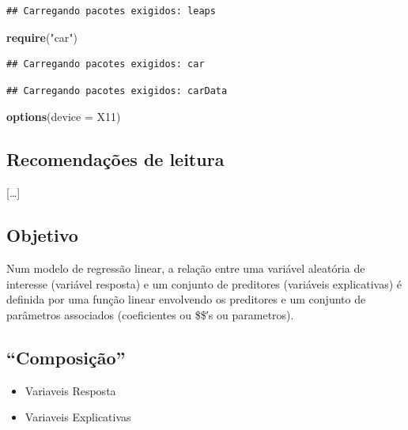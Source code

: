 \documentclass[
]{article}
\newenvironment{Shaded}{\begin{snugshade}}{\end{snugshade}}
\newcommand{\AttributeTok}[1]{\textcolor[rgb]{0.13,0.29,0.53}{#1}}
\newcommand{\FunctionTok}[1]{\textcolor[rgb]{0.13,0.29,0.53}{\textbf{#1}}}
\newcommand{\NormalTok}[1]{#1}
\newcommand{\StringTok}[1]{\textcolor[rgb]{0.31,0.60,0.02}{#1}}
\providecommand{\tightlist}{%
  \setlength{\itemsep}{0pt}\setlength{\parskip}{0pt}}
\begin{document}
\begin{verbatim}
## Carregando pacotes exigidos: leaps
\end{verbatim}

\begin{Shaded}
\begin{Highlighting}[]
\FunctionTok{require}\NormalTok{(}\StringTok{"car"}\NormalTok{)}
\end{Highlighting}
\end{Shaded}

\begin{verbatim}
## Carregando pacotes exigidos: car
\end{verbatim}

\begin{verbatim}
## Carregando pacotes exigidos: carData
\end{verbatim}

\begin{Shaded}
\begin{Highlighting}[]
\FunctionTok{options}\NormalTok{(}\AttributeTok{device =}\NormalTok{ X11)}
\end{Highlighting}
\end{Shaded}

\subsection{Recomendações de
leitura}\label{recomendauxe7uxf5es-de-leitura}

{[}\ldots{]}

\subsection{Objetivo}\label{objetivo}

Num modelo de regressão linear, a relação entre uma variável aleatória
de interesse (variável resposta) e um conjunto de preditores (variáveis
explicativas) é definida por uma função linear envolvendo os preditores
e um conjunto de parâmetros associados (coeficientes ou \$\beta \$′s ou
parametros).

\subsection{``Composição''}\label{composiuxe7uxe3o}

\begin{itemize}
\tightlist
\item
  Variaveis Resposta
\item
  Variaveis Explicativas
\end{itemize}
\end{document}
